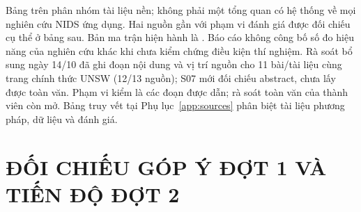\documentclass[12pt,a4paper,oneside]{report}
\begin{document}
Bảng trên phân nhóm tài liệu nền; không phải một tổng quan có hệ thống về mọi nghiên cứu NIDS ứng dụng. Hai nguồn gần với phạm vi đánh giá được đối chiếu cụ thể ở bảng sau. Bản ma trận hiện hành là . Báo cáo không công bố số đo hiệu năng của nghiên cứu khác khi chưa kiểm chứng điều kiện thí nghiệm. Rà soát bổ sung ngày 14/10 đã ghi đoạn nội dung và vị trí nguồn cho 11 bài/tài liệu cùng trang chính thức UNSW (12/13 nguồn); S07 mới đối chiếu abstract, chưa lấy được toàn văn. Phạm vi kiểm là các đoạn được dẫn; rà soát toàn văn của thành viên còn mở. Bảng truy vết tại Phụ lục~\ref{app:sources} phân biệt tài liệu phương pháp, dữ liệu và đánh giá.



\chapter{ĐỐI CHIẾU GÓP Ý ĐỢT 1 VÀ TIẾN ĐỘ ĐỢT 2}
\end{document}
